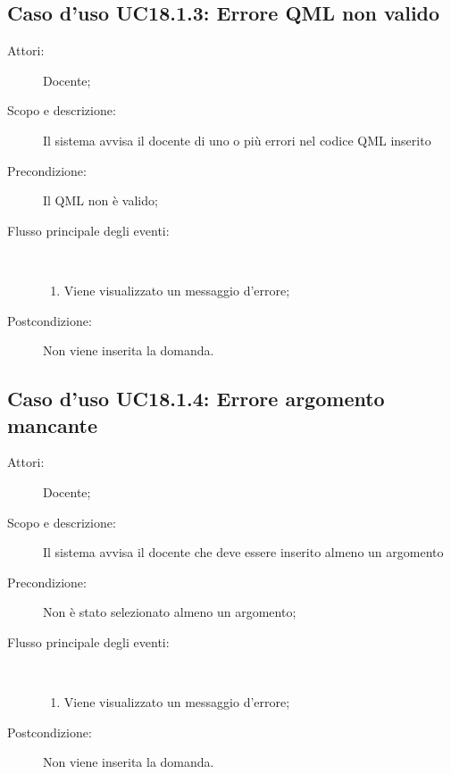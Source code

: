 \subsection{Caso d'uso UC18.1.3: Errore QML non valido}\begin{description}
	\item[Attori:] Docente;
	\item[Scopo e descrizione:] Il sistema avvisa il docente di uno o più errori nel codice QML inserito
	\item[Precondizione:] Il QML non è valido;
	
	\item[Flusso principale degli eventi:] \ 
	\begin{enumerate}
		\item Viene visualizzato un messaggio d'errore;
		
	\end{enumerate}
	\item[Postcondizione:] Non viene inserita la domanda.
\end{description}
\hypertarget{UC18.1.4}{}
\subsection{Caso d'uso UC18.1.4: Errore argomento mancante}\begin{description}
	\item[Attori:] Docente;
	\item[Scopo e descrizione:] Il sistema avvisa il docente che deve essere inserito almeno un argomento
	\item[Precondizione:] Non è stato selezionato almeno un argomento;
	
	\item[Flusso principale degli eventi:] \ 
	\begin{enumerate}
		\item Viene visualizzato un messaggio d'errore;
		
	\end{enumerate}
	\item[Postcondizione:] Non viene inserita la domanda.
\end{description}
\hypertarget{UC18.1.5}{}
